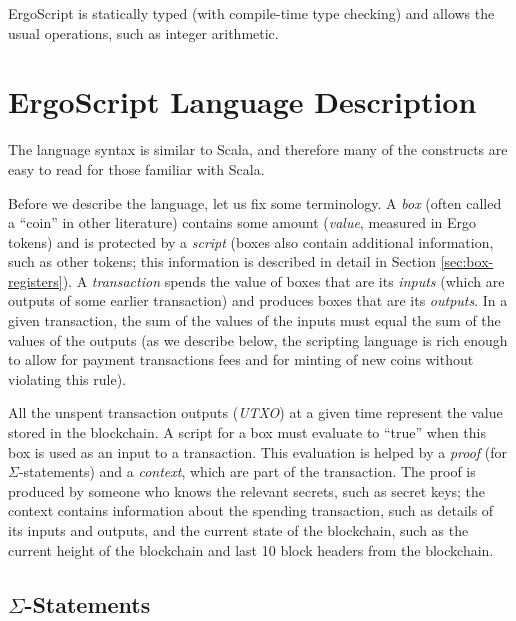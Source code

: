 \documentclass[11pt]{article}
\newcommand{\authnote}[2]{\marginpar{\parbox{\marginparwidth}{\tiny %
  \textsf{#1 {\textcolor{blue}{notes: #2}}}}}%
  \textcolor{blue}{\textbf{\dag}}}
\newcommand{\authnote}[2]{
  \textsf{#1 \textcolor{blue}{: #2}}}
\newcommand{\authnote}[2]{}
\newcommand{\lnote}[1]{{\authnote{\textcolor{orange}{Leo notes}}{#1}}}
\newcommand{\ignore}[1]{}
\newcommand{\langname}{ErgoScript\xspace}
\begin{document}
\langname is statically typed (with compile-time type checking) and allows the usual operations, such as integer arithmetic.

\ignore{
    \paragraph{Running time estimation and safety checks}
    \lnote{someone should fill this in, because I know very little about it}
    See Section \ref{sec:safety} for more details.
}


\section{\langname Language Description}

The language syntax is similar to Scala, and therefore many of the constructs are easy to read for those familiar with Scala. 

Before we describe the language, let us fix some terminology. A \emph{box} (often called a ``coin'' in other literature) contains some amount (\emph{value}, measured in Ergo tokens) and is protected by a \emph{script} (boxes also contain additional information, such as other tokens; this information is described in detail in Section \ref{sec:box-registers}). A \emph{transaction} spends the value of boxes that are its \emph{inputs} (which are outputs of some earlier transaction) and produces boxes that are its \emph{outputs}. In a given transaction, the sum of the values of the inputs must equal the sum of the values of the outputs (as we describe below, the scripting language is rich enough to allow for payment transactions fees and for minting of new coins without violating this rule).


All the unspent transaction outputs (\emph{UTXO}) at a given time represent the value stored in the blockchain. A script for a box must evaluate to ``true'' when this box is used as an input to a transaction. This evaluation is helped by a \emph{proof} (for $\Sigma$-statements) and a \emph{context}, which are part of the transaction. The proof is produced by someone who knows the relevant secrets, such as secret keys; the context contains information about the spending transaction, such as details of its inputs and outputs, and the current state of the blockchain, such as the current height of the blockchain and last 10 block headers from the blockchain.

\subsection{$\Sigma$-Statements}
\end{document}
